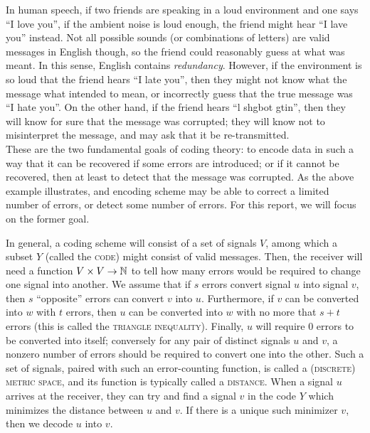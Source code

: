 \documentclass{report}
\begin{document}
    In human speech, if two friends are speaking in a loud environment and one
    says ``I love you'', if the ambient noise is loud enough, the friend might
    hear ``I lave you'' instead.  Not all possible sounds (or combinations of
    letters) are valid messages in English though, so the friend could
    reasonably guess at what was meant.  In this sense, English contains
    \textit{redundancy}.  However, if the environment is so loud that the friend
    hears ``I late you'', then they might not know what the message what
    intended to mean, or incorrectly guess that the true message was ``I hate
    you''.  On the other hand, if the friend hears ``l shgbot gtin'', then they
    will know for sure that the message was corrupted; they will know not to
    misinterpret the message, and may ask that it be re-transmitted.
    \\

    These are the two fundamental goals of coding theory: to encode data in such
    a way that it can be recovered if some errors are introduced; or if it
    cannot be recovered, then at least to detect that the message was corrupted.
    As the above example illustrates, and encoding scheme may be able to correct
    a limited number of errors, or detect some number of errors.  For this
    report, we will focus on the former goal.

    In general, a coding scheme will consist of a set of signals $V$, among
    which a subset $Y$ (called the \textsc{code}) might consist of valid
    messages.  Then, the receiver will need a function $V \times V \to \mathbb{N}$ to
    tell how many errors would be required to change one signal into another.
    We assume that if $s$ errors convert signal $u$ into signal $v$, then $s$
    ``opposite'' errors can convert $v$ into $u$.  Furthermore, if $v$ can be
    converted into $w$ with $t$ errors, then $u$ can be converted into $w$ with
    no more that $s + t$ errors (this is called the \textsc{triangle
    inequality}).  Finally, $u$ will require $0$ errors to be converted into
    itself; conversely for any pair of distinct signals $u$ and $v$, a nonzero
    number of errors should be required to convert one into the other.  Such a
    set of signals, paired with such an error-counting function, is called a
    \textsc{(discrete) metric space}, and its function is typically called a
    \textsc{distance}.  When a signal $u$ arrives at the receiver, they can try
    and find a signal $v$ in the code $Y$ which minimizes the distance between
    $u$ and $v$.  If there is a unique such minimizer $v$, then we decode $u$
    into $v$.
\end{document}
